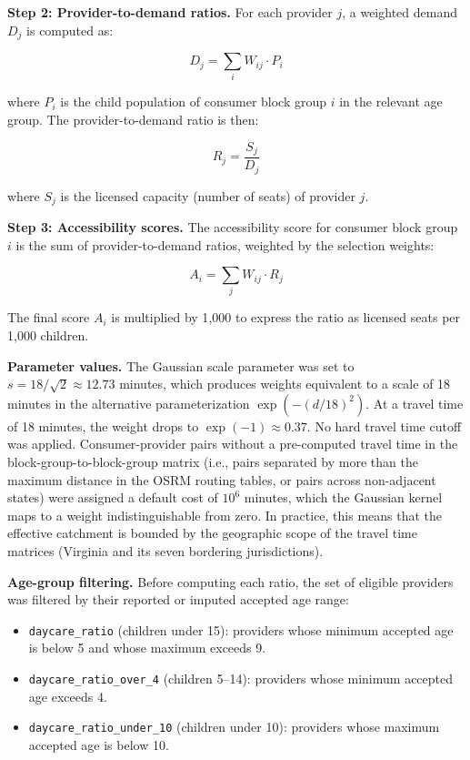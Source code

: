 \documentclass{CUP-JNL-DAP}%
\begin{document}
\textbf{Step 2: Provider-to-demand ratios.} For each provider $j$, a weighted demand $D_{j}$ is computed as:

\begin{equation}
D_{j} = \sum_{i} W_{ij} \cdot P_{i}
\end{equation}

\noindent where $P_{i}$ is the child population of consumer block group $i$ in the relevant age group. The provider-to-demand ratio is then:

\begin{equation}
R_{j} = \frac{S_{j}}{D_{j}}
\end{equation}

\noindent where $S_{j}$ is the licensed capacity (number of seats) of provider $j$.

\textbf{Step 3: Accessibility scores.} The accessibility score for consumer block group $i$ is the sum of provider-to-demand ratios, weighted by the selection weights:

\begin{equation}
A_{i} = \sum_{j} W_{ij} \cdot R_{j}
\end{equation}

\noindent The final score $A_{i}$ is multiplied by 1{,}000 to express the ratio as licensed seats per 1{,}000 children.

\textbf{Parameter values.} The Gaussian scale parameter was set to $s = 18/\sqrt{2} \approx 12.73$ minutes, which produces weights equivalent to a scale of 18 minutes in the alternative parameterization $\exp(-(d/18)^{2})$. At a travel time of 18 minutes, the weight drops to $\exp(-1) \approx 0.37$. No hard travel time cutoff was applied. Consumer-provider pairs without a pre-computed travel time in the block-group-to-block-group matrix (i.e., pairs separated by more than the maximum distance in the OSRM routing tables, or pairs across non-adjacent states) were assigned a default cost of $10^{6}$ minutes, which the Gaussian kernel maps to a weight indistinguishable from zero. In practice, this means that the effective catchment is bounded by the geographic scope of the travel time matrices (Virginia and its seven bordering jurisdictions).

\textbf{Age-group filtering.} Before computing each ratio, the set of eligible providers was filtered by their reported or imputed accepted age range:

\begin{itemize}
\item \texttt{daycare\_ratio} (children under 15): providers whose minimum accepted age is below 5 and whose maximum exceeds 9.
\item \texttt{daycare\_ratio\_over\_4} (children 5--14): providers whose minimum accepted age exceeds 4.
\item \texttt{daycare\_ratio\_under\_10} (children under 10): providers whose maximum accepted age is below 10.
\end{itemize}
\end{document}
